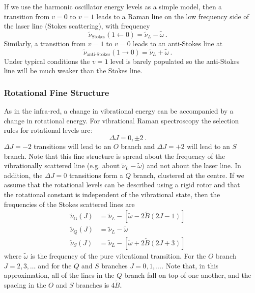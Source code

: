 \documentclass{article}
\theoremstyle{plain}\theoremheaderfont{\normalfont\itshape}\theorembodyfont{\rmfamily}\theoremseparator{.}\newtheorem*{rem}{Remark}\newtheorem*{ex}{Example}\newtheorem*{proof}{Proof}\newtheorem*{altp}{Alternative proof}
\theoremstyle{plain}\theoremheaderfont{\normalfont\bfseries}\theorembodyfont{\rmfamily}\theoremseparator{.}\newtheorem{thm}{Theorem}[section]\newtheorem{lem}[thm]{Lemma}\newtheorem{prop}[thm]{Proposition}\newtheorem*{cor}{Corollary}\newtheorem{defn}[thm]{Definition}\newtheorem{clm}[thm]{Claim}\newtheorem{clminproof}{Claim}\newtheorem{pos}{Postulate}[section]
\theoremstyle{break}\theoremheaderfont{\normalfont\itshape}\theorembodyfont{\rmfamily}\theoremseparator{.\medskip}\newtheorem*{proofskip}{Proof}\newtheorem*{exs}{Examples}\newtheorem*{rems}{Remarks}
\theoremstyle{break}\theoremheaderfont{\normalfont\bfseries}\theorembodyfont{\rmfamily}\theoremseparator{.\medskip}\newtheorem{lemskip}[thm]{Lemma}\newtheorem{defnskip}[thm]{Definition}\newtheorem{propskip}[thm]{Proposition}\newtheorem{thmskip}[thm]{Theorem}
\numberwithin{equation}{section}
\begin{document}
    If we use the harmonic oscillator energy levels as a simple model, then a transition from \(v=0\) to \(v=1\) leads to a Raman line on the low frequency side of the laser line (Stokes scattering), with frequency
    \begin{equation}
        \tilde{\nu}_{\text{Stokes}}(1\leftarrow 0)=\tilde{\nu}_L-\tilde{\omega}\,.
    \end{equation}
    Similarly, a transition from \(v=1\) to \(v=0\) leads to an anti-Stokes line at
    \begin{equation}
        \tilde{\nu}_{\text{anti-Stokes}}(1\rightarrow 0)=\tilde{\nu}_L+\tilde{\omega}\,.
    \end{equation}
    Under typical conditions the \(v=1\) level is barely populated so the anti-Stokes line will be much weaker than the Stokes line.

    \subsubsection*{Rotational Fine Structure}
    As in the infra-red, a change in vibrational energy can be accompanied by a change in rotational energy. For vibrational Raman spectroscopy the selection rules for rotational levels are:
    \begin{equation}
        \Delta J=0,\pm 2\,.
    \end{equation}
    \(\Delta J=-2\) transitions will lead to an \(O\) branch and \(\Delta J=+2\) will lead to an \(S\) branch. Note that this fine structure is spread about the frequency of the vibrationally scattered line (e.g. about \(\tilde{\nu}_L-\tilde{\omega}\)) and not about the laser line. In addition, the \(\Delta J=0\) transitions form a \(Q\) branch, clustered at the centre. If we assume that the rotational levels can be described using a rigid rotor and that the rotational constant is independent of the vibrational state, then the frequencies of the Stokes scattered lines are
    \begin{align}
        \tilde{\nu}_O(J)&=\tilde{\nu}_L-[\tilde{\omega}-2\tilde{B}(2J-1)]\\
        \tilde{\nu}_Q(J)&=\tilde{\nu}_L-\tilde{\omega}\\
        \tilde{\nu}_S(J)&=\tilde{\nu}_L-[\tilde{\omega}+2\tilde{B}(2J+3)]
    \end{align}
    where \(\tilde{\omega}\) is the frequency of the pure vibrational transition. For the \(O\) branch \(J=2,3,\dots\) and for the \(Q\) and \(S\) branches \(J=0,1,\dots\). Note that, in this approximation, all of the lines in the \(Q\) branch fall on top of one another, and the spacing in the \(O\) and \(S\) branches is \(4\tilde{B}\).
\end{document}
